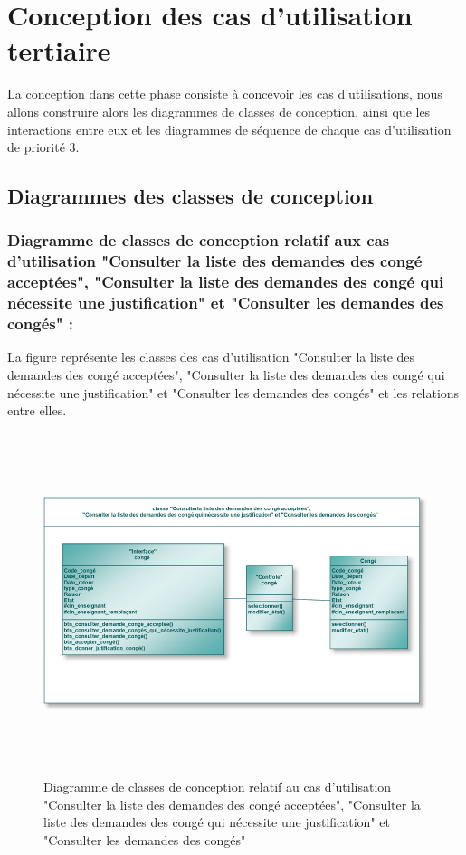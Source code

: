 \documentclass[12 pt ]{report}
\begin{document}
\section{Conception des cas d’utilisation tertiaire }
La conception dans cette phase consiste à concevoir les cas d’utilisations, nous allons construire alors les diagrammes de classes de conception, ainsi que les interactions entre eux et les diagrammes de séquence de chaque cas d’utilisation de priorité 3.
\newpage
\subsection{Diagrammes des classes de conception }
\subsubsection{Diagramme de classes de conception relatif aux cas d’utilisation "Consulter
la liste des demandes des congé acceptées", "Consulter la liste des demandes des congé qui nécessite une justification" et "Consulter les demandes des congés"
 :}
La figure  représente les classes des cas d’utilisation "Consulter
la liste des demandes des congé acceptées", "Consulter la liste des demandes des congé qui nécessite une justification" et "Consulter les demandes des congés"
 et les relations entre elles.
\begin{figure}[h]
 \begin{center}
\includegraphics[width= 14 cm ,height= 10cm]{cl_ccac.PNG}
\caption{Diagramme de classes de conception relatif au cas d’utilisation "Consulter
la liste des demandes des congé acceptées", "Consulter la liste des demandes des congé qui nécessite une justification" et "Consulter les demandes des congés"
 }

\end{center}
\end{figure}
\newpage
\end{document}
